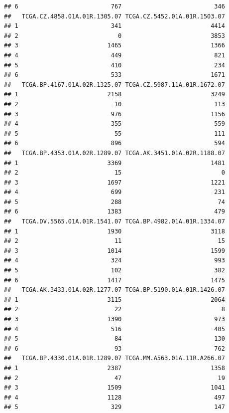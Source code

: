 \documentclass[
]{article}
\begin{document}
\begin{verbatim}
## 6                          767                          346
##   TCGA.CZ.4858.01A.01R.1305.07 TCGA.CZ.5452.01A.01R.1503.07
## 1                          341                         4414
## 2                            0                         3853
## 3                         1465                         1366
## 4                          449                          821
## 5                          410                          234
## 6                          533                         1671
##   TCGA.BP.4167.01A.02R.1325.07 TCGA.CZ.5987.11A.01R.1672.07
## 1                         2158                         3249
## 2                           10                          113
## 3                          976                         1156
## 4                          355                          559
## 5                           55                          111
## 6                          896                          594
##   TCGA.BP.4353.01A.02R.1289.07 TCGA.AK.3451.01A.02R.1188.07
## 1                         3369                         1481
## 2                           15                            0
## 3                         1697                         1221
## 4                          699                          231
## 5                          288                           74
## 6                         1383                          479
##   TCGA.DV.5565.01A.01R.1541.07 TCGA.BP.4982.01A.01R.1334.07
## 1                         1930                         3118
## 2                           11                           15
## 3                         1014                         1599
## 4                          324                          993
## 5                          102                          382
## 6                         1417                         1475
##   TCGA.AK.3433.01A.02R.1277.07 TCGA.BP.5190.01A.01R.1426.07
## 1                         3115                         2064
## 2                           22                            8
## 3                         1390                          973
## 4                          516                          405
## 5                           84                          130
## 6                           93                          762
##   TCGA.BP.4330.01A.01R.1289.07 TCGA.MM.A563.01A.11R.A266.07
## 1                         2387                         1358
## 2                           47                           19
## 3                         1509                         1041
## 4                         1128                          497
## 5                          329                          147

\end{verbatim}
\end{document}
